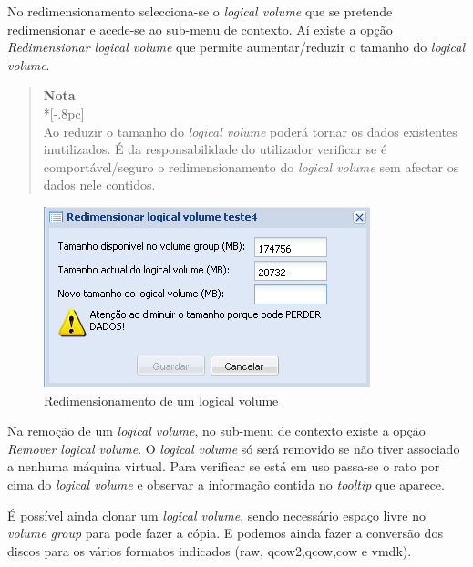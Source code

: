 No redimensionamento selecciona-se o \emph{logical volume} que se pretende redimensionar e acede-se ao sub-menu de contexto. Aí existe a opção \emph{Redimensionar logical volume} que permite aumentar/reduzir o tamanho do \emph{logical volume}.


\begin{quote}
	{\large \bf Nota} \\*[-.8pc]
	\underline{\hspace{6in}} \\
	Ao reduzir o tamanho do \emph{logical volume} poderá tornar os dados existentes inutilizados. É da responsabilidade do utilizador verificar se é comportável/seguro o redimensionamento do \emph{logical volume} sem afectar os dados nele contidos.
\end{quote}


\begin{figure}[H]
        \begin{center}
        \includegraphics[scale=0.5]{screenshots/storage_lv_resize.png}
        \caption{Redimensionamento de um logical volume}
        \label{fig:storage_lv_resize}
        \end{center}
\end{figure}

Na remoção de um \emph{logical volume}, no sub-menu de contexto existe a opção \emph{Remover logical volume}. O \emph{logical volume} só será removido se não tiver associado a nenhuma máquina virtual. Para verificar se está em uso passa-se o rato por cima do \emph{logical volume} e observar a informação contida no \emph{tooltip} que aparece.

É possível ainda clonar um \emph{logical volume}, sendo necessário espaço livre no \emph{volume group} para pode fazer a cópia.
E podemos ainda fazer a conversão dos discos para os vários formatos indicados (raw, qcow2,qcow,cow e vmdk).

